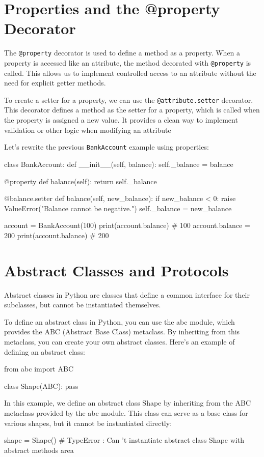 \documentclass[12pt, a4paper, oneside, justified]{article}
\begin{document}
\section{Properties and the @property Decorator}
The \texttt{@property} decorator is used to define a method as a property. When a property is accessed
like an attribute, the method decorated with \texttt{@property} is called. This allows us to implement
controlled access to an attribute without the need for explicit getter methods.

To create a setter for a property, we can use the \texttt{@attribute.setter} decorator. This decorator
defines a method as the setter for a property, which is called when the property is assigned a
new value. It provides a clean way to implement validation or other logic when modifying an attribute

Let's rewrite the previous \texttt{BankAccount} example using properties:

\begin{python}
    class BankAccount:
        def __init__(self, balance):
            self._balance = balance

        @property
        def balance(self):
            return self._balance

        @balance.setter
        def balance(self, new_balance):
            if new_balance < 0:
                raise ValueError("Balance cannot be negative.")
            self._balance = new_balance

    account = BankAccount(100)
    print(account.balance) # 100
    account.balance = 200
    print(account.balance) # 200
\end{python}

\section{Abstract Classes and Protocols}
Abstract classes in Python are classes that define a common interface for their subclasses, but
cannot be instantiated themselves.

To define an abstract class in Python, you can use the abc module, which provides the ABC
(Abstract Base Class) metaclass. By inheriting from this metaclass, you can create your own
abstract classes. Here's an example of defining an abstract class:
\begin{python}
    from abc import ABC

    class Shape(ABC):
        pass
\end{python}
In this example, we define an abstract class Shape by inheriting from the ABC metaclass
provided by the abc module. This class can serve as a base class for various shapes, but it cannot
be instantiated directly:
\begin{python}
    shape = Shape() # TypeError : Can ’t instantiate abstract class Shape with abstract methods area
\end{python}
\end{document}

